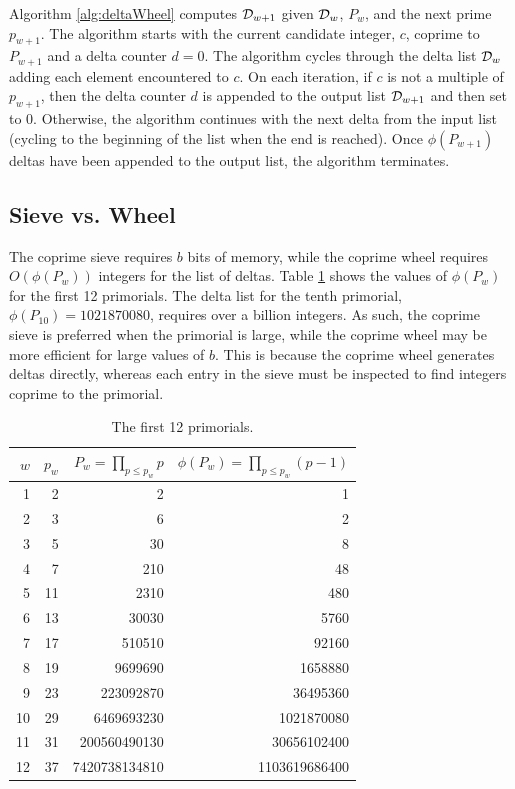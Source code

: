 \documentclass{ucalgthes1}
\theoremstyle{definition}
\begin{document}
Algorithm \ref{alg:deltaWheel} computes $\mathcal D_{w+1}$ given $\mathcal D_w$, $P_w$, and the next prime $p_{w+1}$.  The algorithm starts with the current candidate integer, $c$, coprime to $P_{w+1}$ and a delta counter $d = 0$.  The algorithm cycles through the delta list $\mathcal D_w$ adding each element encountered to $c$.  On each iteration, if $c$ is not a multiple of $p_{w+1}$, then the delta counter $d$ is appended to the output list $\mathcal D_{w+1}$ and then set to 0.  Otherwise, the algorithm continues with the next delta from the input list (cycling to the beginning of the list when the end is reached).  Once $\phi(P_{w+1})$ deltas have been appended to the output list, the algorithm terminates.

\subsection{Sieve vs. Wheel}

The coprime sieve requires $b$ bits of memory, while the coprime wheel requires $O(\phi(P_w))$ integers for the list of deltas.  Table \ref{tab:primorialRateOfGrowth} shows the values of $\phi(P_w)$ for the first 12 primorials.  The delta list for the tenth primorial, $\phi(P_{10}) = 1021870080$, requires over a billion integers.  As such, the coprime sieve is preferred when the primorial is large, while the coprime wheel may be more efficient for large values of $b$.  This is because the coprime wheel generates deltas directly, whereas each entry in the sieve must be inspected to find integers coprime to the primorial.

\begin{table}[h]
\centering
\begin{tabular}{| r | r | r | r |}
	\hline
	$w$ & $p_w$ & $P_w = \prod_{p \le p_w} p$ & $\phi(P_w) = \prod_{p \le p_w} (p-1)$ \\
	\hline
1 & 2 & 2 & 1 \\
2 & 3 & 6 & 2 \\
3 & 5 & 30 & 8 \\
4 & 7 & 210 & 48 \\
5 & 11 & 2310 & 480 \\
6 & 13 & 30030 & 5760 \\
7 & 17 & 510510 & 92160 \\
8 & 19 & 9699690 & 1658880 \\
9 & 23 & 223092870 & 36495360 \\
10 & 29 & 6469693230 & 1021870080 \\
11 & 31 & 200560490130 & 30656102400 \\
12 & 37 & 7420738134810 & 1103619686400 \\
	\hline
\end{tabular}
\caption{The first 12 primorials.}
\label{tab:primorialRateOfGrowth}
\end{table}
\end{document}
